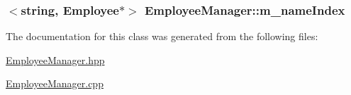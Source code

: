 \subsubsection[{\texorpdfstring{m\+\_\+name\+Index}{m_nameIndex}}]{$<$string, {\bf Employee}$\ast$$>$ Employee\+Manager\+::m\+\_\+name\+Index\hspace{0.3cm}{\ttfamily [private]}}\hypertarget{classEmployeeManager_ac628fff397f71c6728a4d80fb93f3d12}{}\label{classEmployeeManager_ac628fff397f71c6728a4d80fb93f3d12}


The documentation for this class was generated from the following files\+:\begin{DoxyCompactItemize}
\item 
\hyperlink{EmployeeManager_8hpp}{Employee\+Manager.\+hpp}\item 
\hyperlink{EmployeeManager_8cpp}{Employee\+Manager.\+cpp}\end{DoxyCompactItemize}
